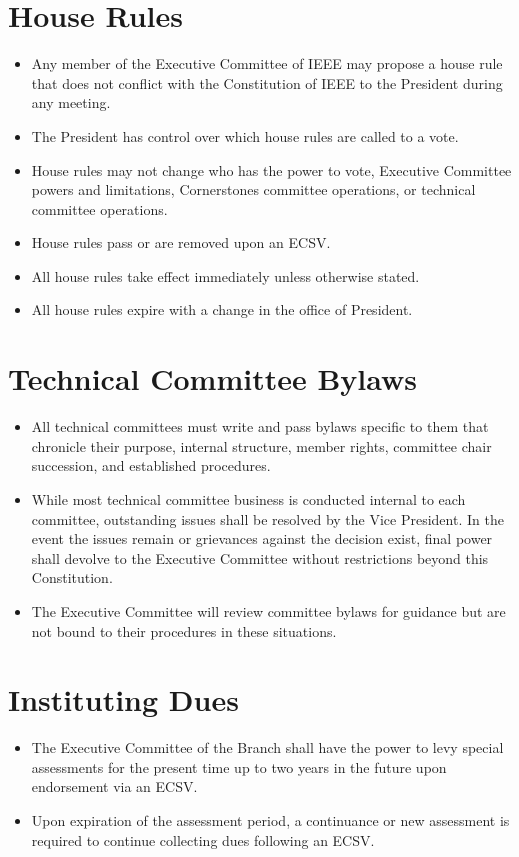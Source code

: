 \documentclass[12pt]{constitution}
\begin{document}
\section{House Rules}
\label{sec:house_rules}
\begin{itemize}
\item Any member of the Executive Committee of IEEE may propose a house rule that does not conflict with the Constitution of IEEE to the President during any meeting.
\item The President has control over which house rules are called to a vote.
\item House rules may not change who has the power to vote, Executive Committee powers and limitations, Cornerstones committee operations, or technical committee operations.
\item House rules pass or are removed upon an ECSV.
\item All house rules take effect immediately unless otherwise stated.
\item All house rules expire with a change in the office of President.
\end{itemize}

\section{Technical Committee Bylaws}
\label{sec:amend_techbylaw}
\begin{itemize}
    \item All technical committees must write and pass bylaws specific to them that chronicle their purpose, internal structure, member rights, committee chair succession, and established procedures.
    \item While most technical committee business is conducted internal to each committee, outstanding issues shall be resolved by the Vice President. In the event the issues remain or grievances against the decision exist, final power shall devolve to the Executive Committee without restrictions beyond this Constitution.
    \item The Executive Committee will review committee bylaws for guidance but are not bound to their procedures in these situations.
\end{itemize}


\label{art:dues}

\section{Instituting Dues}
\label{sec:dues_institute}
\begin{itemize}
    \item The Executive Committee of the Branch shall have the power to levy special assessments for the present time up to two years in the future upon endorsement via an ECSV.
    \item Upon expiration of the assessment period, a continuance or new assessment is required to continue collecting dues following an ECSV.
\end{itemize}
\end{document}
